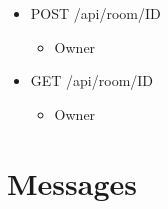 \documentclass[12pt]{article}
\begin{document}
\begin{itemize}
    \item POST /api/room/ID
    \begin{itemize}
        \item Owner
    \end{itemize}
\end{itemize}

\begin{itemize}
    \item GET /api/room/ID
    \begin{itemize}
        \item Owner
    \end{itemize}
\end{itemize}



\section{Messages}
\end{document}
